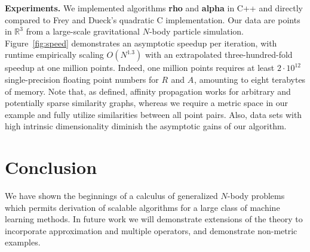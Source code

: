 \documentclass{article}
\newcommand{\killspace}{\vspace{-0.08in}}
\newcommand{\mysection}[1]{\vspace{-0.04in}\section{#1}\killspace}
\newcommand{\respo}[2]{R_{#1#2}}
\newcommand{\avail}[2]{A_{#1#2}}
\begin{document}
{\bf Experiments.} We implemented algorithms {\bf rho} and {\bf alpha} in C++ and directly compared to Frey and Dueck's quadratic C implementation.
Our data are points in $\mathbb{R}^3$ from a large-scale gravitational $N$-body particle simulation.
Figure~\ref{fig:speed} demonstrates an asymptotic speedup per iteration, with runtime empirically scaling $O(N^{1.3})$ with an extrapolated three-hundred-fold speedup at one million points.
Indeed, one million points requires at least $2 \cdot 10^{12}$ single-precision floating point numbers for $\respo{}{}$ and $\avail{}{}$, amounting to eight terabytes of memory.
Note that, as defined, affinity propagation works for arbitrary and potentially sparse similarity graphs, whereas we require a metric space in our example and fully utilize similarities between all point pairs.
Also, data sets with high intrinsic dimensionality diminish the asymptotic gains of our algorithm.

\mysection{Conclusion}

We have shown the beginnings of a calculus of generalized $N$-body problems which permits derivation of scalable algorithms for a large class of machine learning methods.
In future work we will demonstrate extensions of the theory to incorporate approximation and multiple operators, and demonstrate non-metric examples.

\appendix
\end{document}
